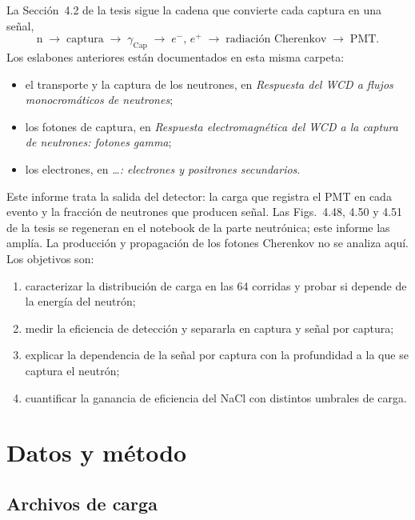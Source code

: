 \documentclass[11pt,a4paper]{article}
\begin{document}
La Sección~4.2 de la tesis sigue la cadena que convierte cada captura en una señal,
\[
\mathrm{n}\;\longrightarrow\;\text{captura}\;\longrightarrow\;\gamma_\mathrm{Cap}\;\longrightarrow\;e^-,\,e^+\;\longrightarrow\;\text{radiación Cherenkov}\;\longrightarrow\;\mathrm{PMT}.
\]
Los eslabones anteriores están documentados en esta misma carpeta:
\begin{itemize}
  \item el transporte y la captura de los neutrones, en \emph{Respuesta del WCD a flujos monocromáticos de neutrones};
  \item los fotones de captura, en \emph{Respuesta electromagnética del WCD a la captura de neutrones: fotones gamma};
  \item los electrones, en \emph{\dots: electrones y positrones secundarios}.
\end{itemize}
Este informe trata la salida del detector: la carga que registra el PMT en cada evento y la fracción de neutrones que producen señal. Las Figs.~4.48, 4.50 y 4.51 de la tesis se regeneran en el notebook de la parte neutrónica; este informe las amplía. La producción y propagación de los fotones Cherenkov no se analiza aquí. Los objetivos son:
\begin{enumerate}
  \item caracterizar la distribución de carga en las 64 corridas y probar si depende de la energía del neutrón;
  \item medir la eficiencia de detección y separarla en captura y señal por captura;
  \item explicar la dependencia de la señal por captura con la profundidad a la que se captura el neutrón;
  \item cuantificar la ganancia de eficiencia del NaCl con distintos umbrales de carga.
\end{enumerate}

\section{Datos y método}

\subsection{Archivos de carga}
\end{document}
